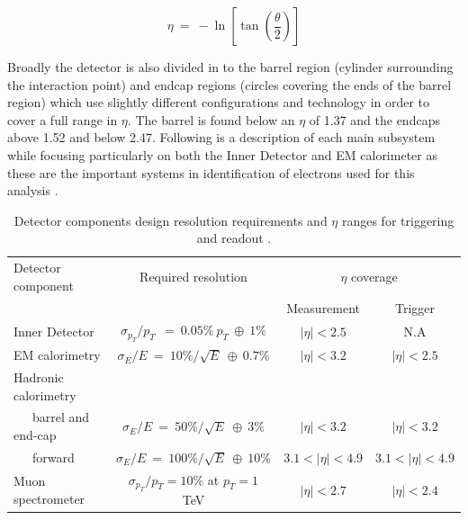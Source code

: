 	\begin{equation}
		\eta~=~-\ln[\tan(\frac{\theta}{2})]
		\label{eq:eta}
	\end{equation}

	Broadly the detector is also divided in to the barrel region (cylinder surrounding the interaction point) and endcap regions (circles covering the ends of the barrel region) which use slightly different configurations and technology in order to cover a full range in $\eta$. The barrel is found below an $\eta$ of 1.37 and the endcaps above 1.52 and below 2.47. Following is a description of each main subsystem while focusing particularly on both the Inner Detector and EM calorimeter as these are the important systems in identification of electrons used for this analysis \cite{Aad:1129811}.


	\begin {table}[h]
	\begin{center}
	\begin{tabular}{ | l | c | c | c | } 
		\hline
		Detector component & Required resolution & \multicolumn{2}{c|}{$\eta$ coverage} \\
		\cline{3-4}
		 & & Measurement & Trigger \\
    	\hline\hline
    	Inner Detector & $\sigma_{p_{T}}/p_{T}~~=~0.05\%~p_{T}~\oplus~1\%$ & $|\eta|<2.5$ & N.A \\
    	\hline
    	EM calorimetry & $\sigma_{E}/E~=~10\%/\sqrt{E}~\oplus~0.7\%$ & $|\eta|<3.2$ & $|\eta|<2.5$ \\
    	\hline
    	Hadronic calorimetry &  &  &  \\
    	~~~barrel and end-cap & $\sigma_{E}/E~=~50\%/\sqrt{E}~\oplus~3\%$ & $|\eta|<3.2$ & $|\eta|<3.2$ \\
    	~~~forward  & $\sigma_{E}/E~=~100\%/\sqrt{E}~\oplus~10\%$ & $3.1<|\eta|<4.9$ & $3.1<|\eta|<4.9$ \\
    	\hline
    	Muon spectrometer & $\sigma_{p_{T}}/p_{T} =10\%$ at $p_{T} = 1$ TeV & $|\eta|<2.7$ & $|\eta|<2.4$ \\
    	\hline
  	\end{tabular}
  	\label{tab:det_res}
  	\caption{Detector components design resolution requirements and $\eta$ ranges for triggering and readout \cite{Aad:1129811}.}
  	\end{center}
	\end {table}




